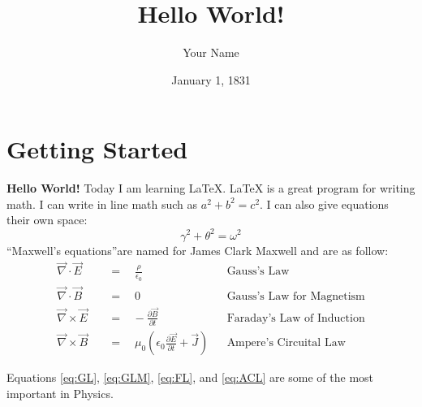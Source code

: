 \documentclass{article}  %
\begin{document}

\title{Hello World!}     %
\author{Your Name}       %
\date{January 1, 1831}   %
\maketitle               %

\section{Getting Started}   %
\textbf{Hello World!} Today I am learning \LaTeX{}. \LaTeX{} is a great program for writing math. I can write in line math such as \(a^2 + b^2 = c^2\). I can also give equations their own space: %
\begin{equation}   %
    \gamma^2 + \theta^2 = \omega^2   %
\end{equation}     %
\textquotedblleft Maxwell\rq s equations\textquotedblright \space are named for James Clark Maxwell and are as follow:   %
\begin{align}          %
    \vec{\nabla} \cdot \vec{E} \quad &=\quad\frac{\rho}{\epsilon_0} &&\text{Gauss's Law} \label{eq:GL}\\    %
    \vec{\nabla} \cdot \vec{B} \quad &=\quad 0 &&\text{Gauss's Law for Magnetism} \label{eq:GLM}\\    %
    \vec{\nabla} \times \vec{E} \quad &=\hspace{10pt}-\frac{\partial{\vec{B}}}{\partial{t}} &&\text{Faraday's Law of Induction} \label{eq:FL}\\   %
    \vec{\nabla} \times \vec{B} \quad &=\quad \mu_0\left( \epsilon_0\frac{\partial{\vec{E}}}{\partial{t}}+\vec{J}\right) &&\text{Ampere's Circuital Law} \label{eq:ACL}   %
\end{align}

Equations \ref{eq:GL}, \ref{eq:GLM}, \ref{eq:FL}, and \ref{eq:ACL} are some of the most important in Physics. %
\end{document}

